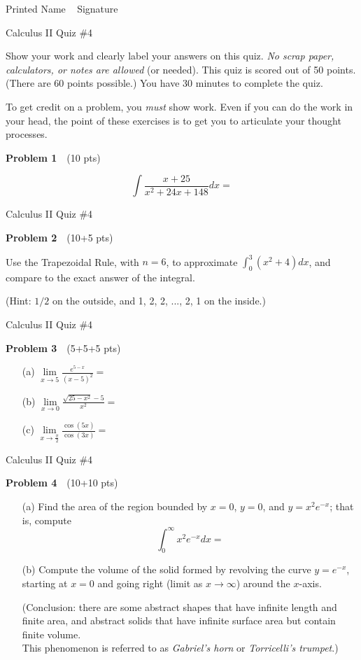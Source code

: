 \documentclass[10pt]{article}
\newcommand{\prob}[1]{\vspace{10mm} \noindent \textbf{Problem #1} \,\,}
\newcommand{\header}{
\begin{center}
Calculus II Quiz \#4
\end{center}

\vspace{2mm}

}
\newcommand{\namefield}{
\noindent Printed Name \underline{\hspace{50mm}} \,\,\, Signature \underline{\hspace{50mm}}
}
\newcommand{\inst}[2]{
Show your work and clearly label your answers on this quiz. \emph{No scrap paper, calculators, or notes are allowed} (or needed). This quiz is scored out of #1 points. (There are #2 points possible.) You have 30 minutes to complete the quiz.

To get credit on a problem, you \emph{must} show work. Even if you can do the work in your head, the point of these exercises is to get you to articulate your thought processes.
}
\begin{document}


\namefield

\header

\inst{50}{60}


\prob{1} (10 pts) %

\[ \int \frac{x+25}{x^2 + 24x + 148} dx = \]

\vspace{60mm} 




\pagebreak

\header

\prob{2} (10+5 pts) %

Use the Trapezoidal Rule, with $n=6$, to approximate $\int_0^3 (x^2 + 4) dx$, and compare to the exact answer of the integral.

(Hint: $1/2$ on the outside, and 1, 2, 2, ..., 2, 1 on the inside.)
\pagebreak

\header

\prob{3} (5+5+5 pts) %

\begin{itemize}
\item[(a) ] $\lim\limits_{x \to 5} \frac{e^{5-x}}{(x-5)^2} = $
\item[(b) ] $\lim\limits_{x \to 0} \frac{\sqrt{25-x^2} - 5}{x^2} = $
\item[(c) ] $\lim\limits_{x \to \frac{\pi}{2}} \frac{\cos(5x)}{\cos(3x)} = $
\end{itemize}

\pagebreak

\header

\prob{4} (10+10 pts) %

\begin{itemize}
\item[(a) ] Find the area of the region bounded by $x=0$, $y=0$, and $y = x^2 e^{-x}$; that is, compute 
\[ \int_0^{\infty} x^2 e^{-x} dx = \]
\item[(b) ] Compute the volume of the solid formed by revolving the curve $y = e^{-x}$, starting at $x=0$ and going right (limit as $x \to \infty$) around the $x$-axis.

\vspace{5mm}

(Conclusion: there are some abstract shapes that have infinite length and finite area, and abstract solids that have infinite surface area but contain finite volume. \\
This phenomenon is referred to as \emph{Gabriel's horn} or \emph{Torricelli's trumpet}.)
\end{itemize}
\end{document}
